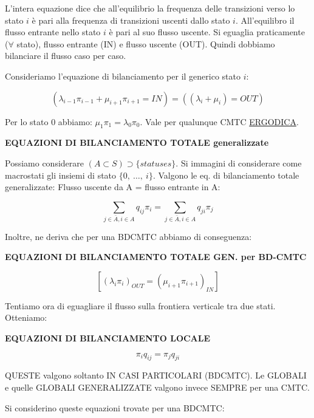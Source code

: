 L'intera equazione dice che all'equilibrio la frequenza delle transizioni verso lo stato $i$ è pari alla frequenza di transizioni uscenti dallo stato $i$. All'equilibro il flusso entrante nello stato $i$ è pari al suo flusso uscente. Si eguaglia praticamente ($\forall$ stato), flusso entrante (IN) e flusso uscente (OUT). Quindi dobbiamo bilanciare il flusso caso per caso.

Consideriamo l'equazione di bilanciamento per il generico stato $i$:

\[	
	(\lambda_{i-1}\pi_{i-1} + \mu_{i+1}\pi_{i+1} = IN) = ((\lambda_i +\mu_i) = OUT)
\]

Per lo stato 0 abbiamo: $\mu_1\pi_1 = \lambda_0\pi_0$.
Vale per qualunque CMTC \underline{ERGODICA}.

\begin{thrm}{\textbf{EQUAZIONI DI BILANCIAMENTO TOTALE generalizzate}}

Possiamo considerare $(A \subset S) \supset \{statuses\}$. Si immagini di considerare come macrostati gli insiemi di stato $\{0,\ \dots,\ i\}$. Valgono le eq. di bilanciamento totale generalizzate: Flusso uscente da A = flusso entrante in A:

\[
	\sum_{j\in \bar{A},i\in A}{q_{ij}\pi_i} = \sum_{j\in \bar{A},i\in A}{q_{ji}\pi_j}
\]

\end{thrm}

Inoltre, ne deriva che per una BDCMTC abbiamo di conseguenza:

\begin{corl}{\textbf{EQUAZIONI DI BILANCIAMENTO TOTALE GEN. per BD-CMTC}}

\[
	[(\lambda_i\pi_i)_{OUT} = (\mu_{i+1}\pi_{i+1})_{IN}]
\]

\end{corl}

Tentiamo ora di eguagliare il flusso sulla frontiera verticale tra due stati. Otteniamo:

\begin{thrm}{\textbf{EQUAZIONI DI BILANCIAMENTO LOCALE}}


\[
	\pi_iq_{ij} = \pi_jq_{ji}
\]

\end{thrm}

QUESTE valgono soltanto IN CASI PARTICOLARI (BDCMTC). Le GLOBALI e quelle GLOBALI GENERALIZZATE valgono invece SEMPRE per una CMTC.

Si considerino queste equazioni trovate per una BDCMTC:

